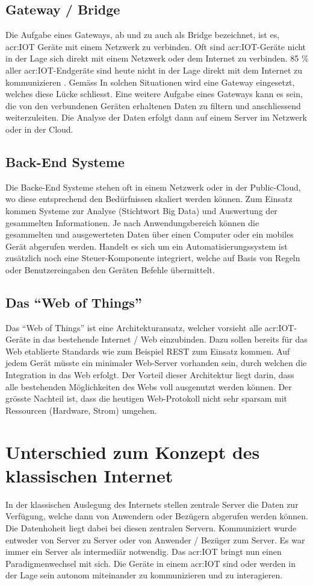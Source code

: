 \subsection{Gateway / Bridge}
Die Aufgabe eines Gateways, ab und zu auch als Bridge bezeichnet, ist es, \gls{acr:IOT} Geräte mit einem Netzwerk zu verbinden. Oft sind \gls{acr:IOT}-Geräte nicht in der Lage sich direkt mit einem Netzwerk oder dem Internet zu verbinden. 85 \% aller \gls{acr:IOT}-Endgeräte sind heute nicht in der Lage direkt mit dem Internet zu kommunizieren \cite[S. 2]{E:Intel:WhitePaper:DevelopingSolutionsIoT}. Gemäss In solchen Situationen wird eine Gateway eingesetzt, welches diese Lücke schliesst. Eine weitere Aufgabe eines Gateways kann es sein, die von den verbundenen Geräten erhaltenen Daten zu filtern und anschliessend weiterzuleiten. Die Analyse der Daten erfolgt dann auf einem Server im Netzwerk oder in der Cloud. 


\subsection{Back-End Systeme}
Die Backe-End Systeme stehen oft in einem Netzwerk oder in der Public-Cloud, wo diese entsprechend den Bedürfnissen skaliert werden können. Zum Einsatz kommen Systeme zur Analyse (Stichtwort Big Data) und Auswertung der gesammelten Informationen. Je nach Anwendungsbereich können die gesammelten und ausgewerteten Daten über einen Computer oder ein mobiles Gerät abgerufen werden. Handelt es sich um ein Automatisierungssystem ist zusätzlich noch eine Steuer-Komponente integriert, welche auf Basis von Regeln oder Benutzereingaben den Geräten Befehle übermittelt.


\subsection{Das "`Web of Things"'}
Das "`Web of Things"' ist eine Architekturansatz, welcher vorsieht alle \gls{acr:IOT}-Geräte in das bestehende Internet / Web einzubinden. Dazu sollen bereits für das Web etablierte Standards wie zum Beispiel REST zum Einsatz kommen. Auf jedem Gerät müsste ein minimaler Web-Server vorhanden sein, durch welchen die Integration in das Web erfolgt. Der Vorteil dieser Architektur liegt darin, dass alle bestehenden Möglichkeiten des Webs voll ausgenutzt werden können. Der grösste Nachteil ist, dass die heutigen Web-Protokoll nicht sehr sparsam mit Ressourcen (Hardware, Strom) umgehen.

\section{Unterschied zum Konzept des klassischen Internet}
In der klassischen Auslegung des Internets stellen zentrale Server die Daten zur Verfügung, welche dann von Anwendern oder Bezügern abgerufen werden können. Die Datenhoheit liegt dabei bei diesen zentralen Servern. Kommuniziert wurde entweder von Server zu Server oder von Anwender / Bezüger zum Server. Es war immer ein Server als intermediär notwendig. Das \gls{acr:IOT} bringt nun einen Paradigmenwechsel mit sich. Die Geräte in einem \gls{acr:IOT} sind oder werden in der Lage sein autonom miteinander zu kommunizieren und zu interagieren. 


